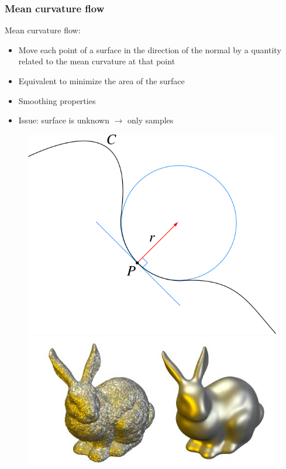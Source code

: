 \documentclass{beamer}
\begin{document}
\begin{frame}
    \frametitle{Mean curvature flow}

    Mean curvature flow:
    \begin{itemize}
        \item Move each point of a surface in the direction of the normal by a
            quantity related to the mean curvature at that point
        \item Equivalent to minimize the area of the surface
        \item Smoothing properties
        \item Issue: surface is unknown $ \to $ only samples
    \end{itemize}

    \begin{figure}
        \centering
        \includegraphics[scale=0.25]{img/osculating-circle}
        \includegraphics[scale=0.22]{img/mean-curvature-flow-rabbit}
    \end{figure}
\end{frame}
\end{document}
